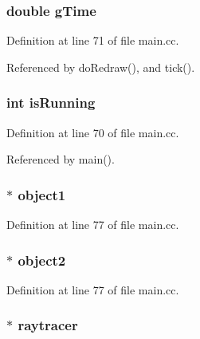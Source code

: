 \subsubsection[{g\+Time}]{\setlength{\rightskip}{0pt plus 5cm}double g\+Time}\label{main_8cc_afdd1bc2e0287b11c764d4d2d05c0c7e7}


Definition at line 71 of file main.\+cc.



Referenced by do\+Redraw(), and tick().

\subsubsection[{is\+Running}]{\setlength{\rightskip}{0pt plus 5cm}int is\+Running}\label{main_8cc_a32ba696eaeb5eef403599f4bb8b376e7}


Definition at line 70 of file main.\+cc.



Referenced by main().

\subsubsection[{object1}]{$\ast$ object1}\label{main_8cc_ac53c691c7d09fea34558463b9617c400}


Definition at line 77 of file main.\+cc.

\subsubsection[{object2}]{ $\ast$ object2}\label{main_8cc_abccc30eef220ab7694fa06309693cd05}


Definition at line 77 of file main.\+cc.

\subsubsection[{raytracer}]{$\ast$ raytracer}\label{main_8cc_abe8032d8c8b72ac9d1046e8f29acb0f1}


